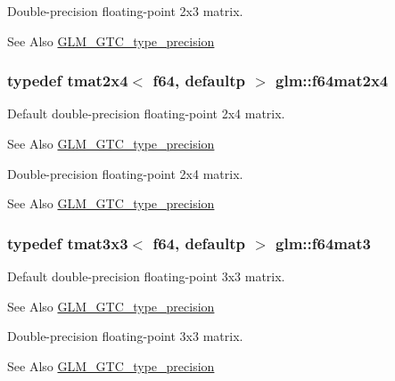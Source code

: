 Double-\/precision floating-\/point 2x3 matrix. \begin{DoxySeeAlso}{See Also}
\hyperlink{group__gtc__type__precision}{G\-L\-M\-\_\-\-G\-T\-C\-\_\-type\-\_\-precision} 
\end{DoxySeeAlso}
\hypertarget{group__gtc__type__precision_gaf18b9f693f2ef743d93c9afd5cfbe229}{
\subsubsection[{f64mat2x4}]{\setlength{\rightskip}{0pt plus 5cm}typedef tmat2x4$<$ f64, defaultp $>$ {\bf glm\-::f64mat2x4}}}\label{group__gtc__type__precision_gaf18b9f693f2ef743d93c9afd5cfbe229}
Default double-\/precision floating-\/point 2x4 matrix. \begin{DoxySeeAlso}{See Also}
\hyperlink{group__gtc__type__precision}{G\-L\-M\-\_\-\-G\-T\-C\-\_\-type\-\_\-precision}
\end{DoxySeeAlso}
Double-\/precision floating-\/point 2x4 matrix. \begin{DoxySeeAlso}{See Also}
\hyperlink{group__gtc__type__precision}{G\-L\-M\-\_\-\-G\-T\-C\-\_\-type\-\_\-precision} 
\end{DoxySeeAlso}
\hypertarget{group__gtc__type__precision_ga44f23eb3c2e893d0afb1aa2b9e89be76}{
\subsubsection[{f64mat3}]{\setlength{\rightskip}{0pt plus 5cm}typedef tmat3x3$<$ f64, defaultp $>$ {\bf glm\-::f64mat3}}}\label{group__gtc__type__precision_ga44f23eb3c2e893d0afb1aa2b9e89be76}
Default double-\/precision floating-\/point 3x3 matrix. \begin{DoxySeeAlso}{See Also}
\hyperlink{group__gtc__type__precision}{G\-L\-M\-\_\-\-G\-T\-C\-\_\-type\-\_\-precision}
\end{DoxySeeAlso}
Double-\/precision floating-\/point 3x3 matrix. \begin{DoxySeeAlso}{See Also}
\hyperlink{group__gtc__type__precision}{G\-L\-M\-\_\-\-G\-T\-C\-\_\-type\-\_\-precision} 
\end{DoxySeeAlso}
